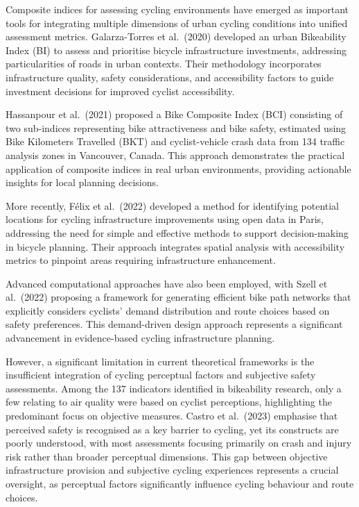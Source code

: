 \documentclass[
  12pt,
  oneside]{book}
\begin{document}
Composite indices for assessing cycling environments have emerged as important tools for integrating multiple dimensions of urban cycling conditions into unified assessment metrics. Galarza-Torres et al.~(2020) developed an urban Bikeability Index (BI) to assess and prioritise bicycle infrastructure investments, addressing particularities of roads in urban contexts. Their methodology incorporates infrastructure quality, safety considerations, and accessibility factors to guide investment decisions for improved cyclist accessibility.

Hassanpour et al.~(2021) proposed a Bike Composite Index (BCI) consisting of two sub-indices representing bike attractiveness and bike safety, estimated using Bike Kilometers Travelled (BKT) and cyclist-vehicle crash data from 134 traffic analysis zones in Vancouver, Canada. This approach demonstrates the practical application of composite indices in real urban environments, providing actionable insights for local planning decisions.

More recently, Félix et al.~(2022) developed a method for identifying potential locations for cycling infrastructure improvements using open data in Paris, addressing the need for simple and effective methods to support decision-making in bicycle planning. Their approach integrates spatial analysis with accessibility metrics to pinpoint areas requiring infrastructure enhancement.

Advanced computational approaches have also been employed, with Szell et al.~(2022) proposing a framework for generating efficient bike path networks that explicitly considers cyclists' demand distribution and route choices based on safety preferences. This demand-driven design approach represents a significant advancement in evidence-based cycling infrastructure planning.

However, a significant limitation in current theoretical frameworks is the insufficient integration of cycling perceptual factors and subjective safety assessments. Among the 137 indicators identified in bikeability research, only a few relating to air quality were based on cyclist perceptions, highlighting the predominant focus on objective measures. Castro et al.~(2023) emphasise that perceived safety is recognised as a key barrier to cycling, yet its constructs are poorly understood, with most assessments focusing primarily on crash and injury risk rather than broader perceptual dimensions. This gap between objective infrastructure provision and subjective cycling experiences represents a crucial oversight, as perceptual factors significantly influence cycling behaviour and route choices.
\end{document}
